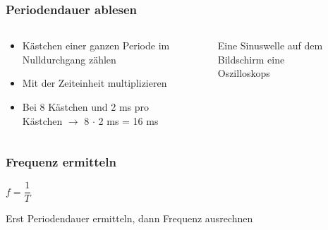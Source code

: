 \begin{frame}
\frametitle{Periodendauer ablesen}
\begin{columns}
    \begin{column}{0.48\textwidth}
    \begin{itemize}
  \item Kästchen einer ganzen Periode im Nulldurchgang zählen
  \item Mit der Zeiteinheit multiplizieren
  \item Bei 8 Kästchen und 2 ms pro Kästchen $\rightarrow$ 8 $\cdot$ 2 ms = 16 ms
  \end{itemize}

    \end{column}
   \begin{column}{0.48\textwidth}
       
\begin{figure}
    \caption{\scriptsize Eine Sinuswelle auf dem Bildschirm eine Oszilloskops}
    \label{e_sinuswelle_oszilloskop}
\end{figure}


   \end{column}
\end{columns}

\end{frame}

\begin{frame}
\end{frame}

\begin{frame}
\frametitle{Frequenz ermitteln}
$f = \dfrac{1}{T}$

Erst Periodendauer ermitteln, dann Frequenz ausrechnen

\end{frame}

